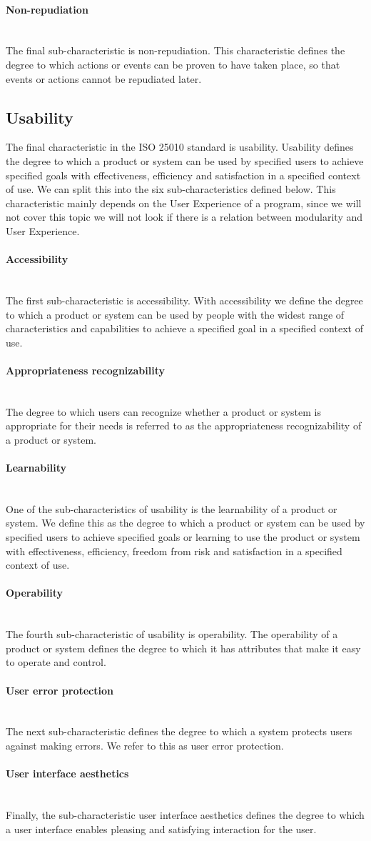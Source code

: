 \documentclass[twoside]{uva-inf-bachelor-thesis}
\newcommand{\myparagraph}[1]{\paragraph{#1}\mbox{}\\}
\begin{document}
\myparagraph{Non-repudiation}
The final sub-characteristic is non-repudiation. This characteristic defines the degree to which actions or events can be proven to have taken place, so that events or actions cannot be repudiated later.

\subsection{Usability}
The final characteristic in the ISO 25010 standard is usability. Usability defines the degree to which a product or system can be used by specified users to achieve specified goals with effectiveness, efficiency and satisfaction in a specified context of use. We can split this into the six sub-characteristics defined below. This characteristic mainly depends on the User Experience of a program, since we will not cover this topic we will not look if there is a relation between modularity and User Experience.

\myparagraph{Accessibility}
The first sub-characteristic is accessibility. With accessibility we define the degree to which a product or system can be used by people with the widest range of characteristics and capabilities to achieve a specified goal in a specified context of use.

\myparagraph{Appropriateness recognizability}
The degree to which users can recognize whether a product or system is appropriate for their needs is referred to as the appropriateness recognizability of a product or system.

\myparagraph{Learnability}
One of the sub-characteristics of usability is the learnability of a product or system. We define this as the degree to which a product or system can be used by specified users to achieve specified goals or learning to use the product or system with effectiveness, efficiency, freedom from risk and satisfaction in a specified context of use.

\myparagraph{Operability}
The fourth sub-characteristic of usability is operability. The operability of a product or system defines the degree to which it has attributes that make it easy to operate and control.

\myparagraph{User error protection}
The next sub-characteristic defines the degree to which a system protects users against making errors. We refer to this as user error protection.

\myparagraph{User interface aesthetics}
Finally, the sub-characteristic user interface aesthetics defines the degree to which a user interface enables pleasing and satisfying interaction for the user.
\end{document}

